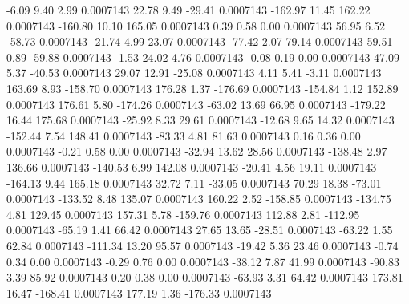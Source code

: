        -6.09        9.40        2.99     0.0007143
       22.78        9.49      -29.41     0.0007143
     -162.97       11.45      162.22     0.0007143
     -160.80       10.10      165.05     0.0007143
        0.39        0.58        0.00     0.0007143
       56.95        6.52      -58.73     0.0007143
      -21.74        4.99       23.07     0.0007143
      -77.42        2.07       79.14     0.0007143
       59.51        0.89      -59.88     0.0007143
       -1.53       24.02        4.76     0.0007143
       -0.08        0.19        0.00     0.0007143
       47.09        5.37      -40.53     0.0007143
       29.07       12.91      -25.08     0.0007143
        4.11        5.41       -3.11     0.0007143
      163.69        8.93     -158.70     0.0007143
      176.28        1.37     -176.69     0.0007143
     -154.84        1.12      152.89     0.0007143
      176.61        5.80     -174.26     0.0007143
      -63.02       13.69       66.95     0.0007143
     -179.22       16.44      175.68     0.0007143
      -25.92        8.33       29.61     0.0007143
      -12.68        9.65       14.32     0.0007143
     -152.44        7.54      148.41     0.0007143
      -83.33        4.81       81.63     0.0007143
        0.16        0.36        0.00     0.0007143
       -0.21        0.58        0.00     0.0007143
      -32.94       13.62       28.56     0.0007143
     -138.48        2.97      136.66     0.0007143
     -140.53        6.99      142.08     0.0007143
      -20.41        4.56       19.11     0.0007143
     -164.13        9.44      165.18     0.0007143
       32.72        7.11      -33.05     0.0007143
       70.29       18.38      -73.01     0.0007143
     -133.52        8.48      135.07     0.0007143
      160.22        2.52     -158.85     0.0007143
     -134.75        4.81      129.45     0.0007143
      157.31        5.78     -159.76     0.0007143
      112.88        2.81     -112.95     0.0007143
      -65.19        1.41       66.42     0.0007143
       27.65       13.65      -28.51     0.0007143
      -63.22        1.55       62.84     0.0007143
     -111.34       13.20       95.57     0.0007143
      -19.42        5.36       23.46     0.0007143
       -0.74        0.34        0.00     0.0007143
       -0.29        0.76        0.00     0.0007143
      -38.12        7.87       41.99     0.0007143
      -90.83        3.39       85.92     0.0007143
        0.20        0.38        0.00     0.0007143
      -63.93        3.31       64.42     0.0007143
      173.81       16.47     -168.41     0.0007143
      177.19        1.36     -176.33     0.0007143
